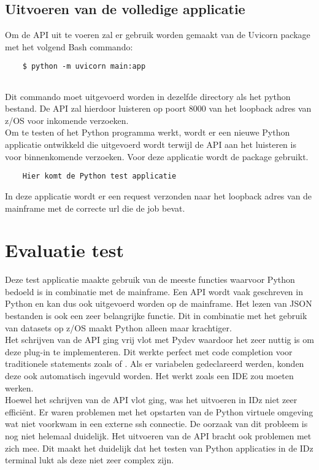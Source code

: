 \section{Uitvoeren van de volledige applicatie}
Om de API uit te voeren zal er gebruik worden gemaakt van de Uvicorn package met het volgend Bash commando:

\begin{lstlisting}
    $ python -m uvicorn main:app
    
\end{lstlisting}
Dit commando moet uitgevoerd worden in dezelfde directory als het python bestand. De API zal hierdoor luisteren op poort 8000 van het loopback adres van z/OS voor inkomende verzoeken. \\

Om te testen of het Python programma werkt, wordt er een nieuwe Python applicatie ontwikkeld die uitgevoerd wordt terwijl de API aan het luisteren is voor binnenkomende verzoeken. Voor deze applicatie wordt de  package gebruikt. 

\begin{lstlisting}
    Hier komt de Python test applicatie
\end{lstlisting}

In deze applicatie wordt er een request verzonden naar het loopback adres van de mainframe met de correcte url die de job  bevat. 

\chapter{Evaluatie test}
\label{ch:eval-test}
Deze test applicatie maakte gebruik van de meeste functies waarvoor Python bedoeld is in combinatie met de mainframe. Een API wordt vaak geschreven in Python en kan dus ook uitgevoerd worden op de mainframe. Het lezen van JSON bestanden is ook een zeer belangrijke functie. Dit in combinatie met het gebruik van datasets op z/OS maakt Python alleen maar krachtiger. \\

Het schrijven van de API ging vrij vlot met Pydev waardoor het zeer nuttig is om deze plug-in te implementeren. Dit werkte perfect met code completion voor traditionele statements zoals  of . Als er variabelen gedeclareerd werden, konden deze ook automatisch ingevuld worden. Het werkt zoals een IDE zou moeten werken. \\

Hoewel het schrijven van de API vlot ging, was het uitvoeren in IDz niet zeer efficiënt. Er waren problemen met het opstarten van de Python virtuele omgeving wat niet voorkwam in een externe ssh connectie. De oorzaak van dit probleem is nog niet helemaal duidelijk. Het uitvoeren van de API bracht ook problemen met zich mee. Dit maakt het duidelijk dat het testen van Python applicaties in de IDz terminal lukt als deze niet zeer complex zijn.







